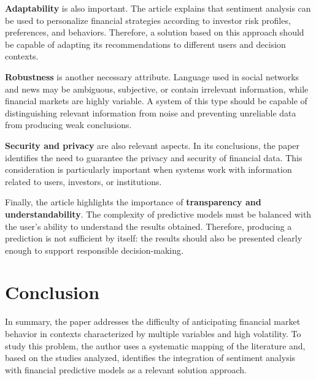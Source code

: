 \vspace{2mm}

\textbf{Adaptability} is also important. The article explains that sentiment analysis can be used to personalize financial strategies according to investor risk profiles, preferences, and behaviors. Therefore, a solution based on this approach should be capable of adapting its recommendations to different users and decision contexts.

\vspace{2mm}

\textbf{Robustness} is another necessary attribute. Language used in social networks and news may be ambiguous, subjective, or contain irrelevant information, while financial markets are highly variable. A system of this type should be capable of distinguishing relevant information from noise and preventing unreliable data from producing weak conclusions.

\vspace{2mm}

\textbf{Security and privacy} are also relevant aspects. In its conclusions, the paper identifies the need to guarantee the privacy and security of financial data. This consideration is particularly important when systems work with information related to users, investors, or institutions.

\vspace{2mm}

Finally, the article highlights the importance of \textbf{transparency and understandability}. The complexity of predictive models must be balanced with the user's ability to understand the results obtained. Therefore, producing a prediction is not sufficient by itself: the results should also be presented clearly enough to support responsible decision-making.


\section{Conclusion}
\vspace{2mm}

In summary, the paper addresses the difficulty of anticipating financial market behavior in contexts characterized by multiple variables and high volatility. To study this problem, the author uses a systematic mapping of the literature and, based on the studies analyzed, identifies the integration of sentiment analysis with financial predictive models as a relevant solution approach.

\vspace{2mm}

